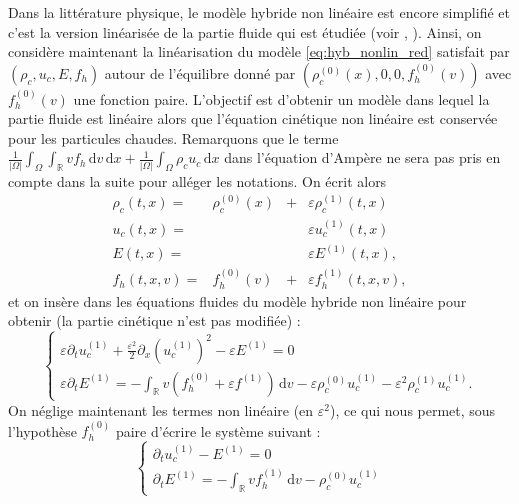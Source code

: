 Dans la littérature physique, le modèle hybride non linéaire est encore simplifié et c'est la version linéarisée de la partie fluide qui est étudiée (voir \cite{Holderied:2019}, \cite{Tronci:2014}). Ainsi, on considère maintenant la linéarisation du modèle \eqref{eq:hyb_nonlin_red} satisfait par $(\rho_c, u_c, E, f_h)$ autour de l'équilibre donné par  $(\rho_c^{(0)}(x), 0, 0, f^{(0)}_h(v))$ avec $f^{(0)}_h(v)$ une fonction paire. L'objectif est d'obtenir un modèle dans lequel la partie fluide est linéaire alors que l'équation cinétique non linéaire  est conservée pour les particules chaudes. Remarquons que le terme $\frac{1}{|\Omega|}\int_\Omega \int_{\mathbb{R}} vf_h\,\mathrm{d}v \,\mathrm{d}x+ \frac{1}{|\Omega|}\int_\Omega \rho_cu_c \,\mathrm{d}x$ dans l'équation d'Ampère ne sera pas pris en compte dans la suite pour alléger les notations. 
On écrit alors
\begin{equation}
  \begin{aligned}
    \rho_c(t,x) = & \rho_c^{(0)}(x) & + & \varepsilon\rho_c^{(1)}(t,x) \\
    u_c(t,x)    = &                 &   & \varepsilon u_c^{(1)}(t,x) \\
    E(t,x)      = &                 &   & \varepsilon E^{(1)}(t,x), \\
    f_h(t,x, v)   = &  f^{(0)}_h(v)   & + & \varepsilon f_h^{(1)}(t,x,v), 
  \end{aligned}
  \label{eq:lin_variables}
\end{equation}
et on insère dans les équations fluides du modèle hybride non linéaire pour obtenir (la partie cinétique n'est pas modifiée) :
$$
  \begin{cases}
    \varepsilon \partial_t u_c^{(1)}
      + \frac{\varepsilon^2}{2}\partial_x\left(u_c^{(1)}\right)^2
      - \varepsilon E^{(1)} = 0 \\
    \varepsilon\partial_t E^{(1)} = -\int_{\mathbb{R}} v(f_h^{(0)} + \varepsilon f^{(1)} )\,\mathrm{d}v
      - \varepsilon\rho_c^{(0)}u_c^{(1)} - \varepsilon^2\rho_c^{(1)}u_c^{(1)}. 
  \end{cases}
$$
On néglige maintenant  les termes non linéaire (en $\varepsilon^2$), ce qui nous permet, sous l'hypothèse $f_{h}^{(0)}$ paire d'écrire le système suivant :
$$
  \begin{cases}
    \partial_t u_c^{(1)} -  E^{(1)} = 0 \\
    \partial_t E^{(1)} = -\int_{\mathbb{R}} vf^{(1)}_h\,\mathrm{d}v - \rho_c^{(0)}u_c^{(1)}
  \end{cases}
$$
